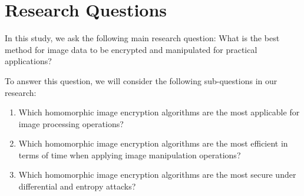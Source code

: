 \section{Research Questions}

In this study, we ask the following main research question: What is the best method for image data to be encrypted and manipulated for practical applications?

To answer this question, we will consider the following sub-questions in our research:
\begin{enumerate}
	\item Which homomorphic image encryption algorithms are the most applicable for image processing operations?
	\item Which homomorphic image encryption algorithms are the most efficient in terms of time when applying image manipulation operations?
	\item Which homomorphic image encryption algorithms are the most secure under differential and entropy attacks?
\end{enumerate}
